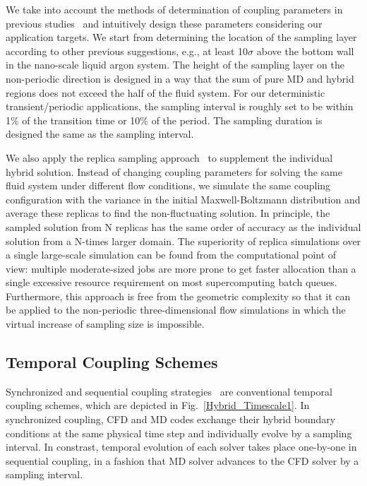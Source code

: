 \documentclass[preprint,12pt]{elsarticle}
\begin{document}
We take into account the methods of determination of coupling parameters in previous studies~\cite{Nie,Yen,Liu,Hadjicon1,Hadjicon2,Werder,Flekkoy,Delgado1,Time_Mechanism} and intuitively design these parameters considering our application targets. We start from determining the location of the sampling layer according to other previous suggestions, e.g., at least 10$\sigma$ above the bottom wall in the nano-scale liquid argon system. The height of the sampling layer on the non-periodic direction is designed in a way that the sum of pure MD and hybrid regions does not exceed the half of the fluid system. For our deterministic transient/periodic applications, the sampling interval is roughly set to be within 1\% of the transition time or 10\% of the period. The sampling duration is designed the same as the sampling interval.

We also apply the replica sampling approach~\cite{REMD} to supplement the individual hybrid solution. Instead of changing coupling parameters for solving the same fluid system under different flow conditions, we simulate the same coupling configuration with the variance in the initial Maxwell-Boltzmann distribution and average these replicas to find the non-fluctuating solution. In principle, the sampled solution from N replicas has the same order of accuracy as the individual solution from a N-times larger domain. The superiority of replica simulations over a single large-scale simulation can be found from the computational point of view: multiple moderate-sized jobs are more prone to get faster allocation than a single excessive resource requirement on most supercomputing batch queues. Furthermore, this approach is free from the geometric complexity so that it can be applied to the non-periodic three-dimensional flow simulations in which the virtual increase of sampling size is impossible.



\subsection{Temporal Coupling Schemes}
\label{sec:numerical_temporal}

Synchronized and sequential coupling strategies~\cite{Time_Mechanism} are
conventional temporal coupling schemes, which are depicted in
Fig.~\ref{Hybrid_Timescale1}. In synchronized coupling, CFD and MD codes
exchange their hybrid boundary conditions at the same physical time step
and individually evolve by a sampling interval. In constrast, temporal
evolution of each solver takes place one-by-one in sequential coupling,
in a fashion that MD solver advances to the CFD solver by a sampling interval.
\end{document}
